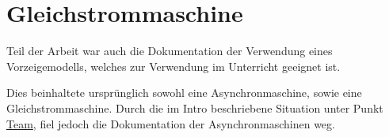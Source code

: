 \chapter{Gleichstrommaschine}

Teil der Arbeit war auch die Dokumentation der Verwendung eines Vorzeigemodells, welches zur Verwendung im Unterricht geeignet ist.

Dies beinhaltete ursprünglich sowohl eine Asynchronmaschine, sowie eine Gleichstrommaschine.
Durch die im Intro beschriebene Situation unter Punkt \hyperref[team]{Team}, fiel jedoch die Dokumentation der Asynchronmaschinen weg.